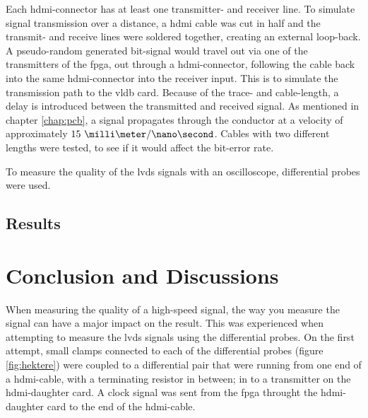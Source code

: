 \documentclass[main.tex]{subfiles}
\begin{document}
Each \gls{hdmi}-connector has at least one transmitter- and receiver line. To simulate signal transmission over a distance, a \gls{hdmi} cable was cut in half and the transmit- and receive lines were soldered together, creating an external loop-back. A pseudo-random generated bit-signal would travel out via one of the transmitters of the \gls{fpga}, out through a \gls{hdmi}-connector, following the cable back into the same \gls{hdmi}-connector into the receiver input. This is to simulate the transmission path to the \gls{vldb} card. Because of the trace- and cable-length, a delay is introduced between the transmitted and received signal. As mentioned in chapter \ref{chap:pcb}, a signal propagates through the conductor at a velocity of approximately $15\ \milli\meter/\nano\second$. Cables with two different lengths were tested, to see if it would affect the bit-error rate.

To measure the quality of the \gls{lvds} signals with an oscilloscope, differential probes were used.  


\subsection{Results}


\section{Conclusion and Discussions}


When measuring the quality of a high-speed signal, the way you measure the signal can have a major impact on the result. This was experienced when attempting to measure the \gls{lvds} signals using the differential probes. On the first attempt, small clamps connected to each of the differential probes (figure \ref{fig:hektere}) were coupled to a differential pair that were running from one end of a hdmi-cable, with a terminating resistor in between; in to a transmitter on the \gls{hdmi}-daughter card. A clock signal was sent from the \gls{fpga} throught the \gls{hdmi}-daughter card to the end of the hdmi-cable. 
\end{document}
